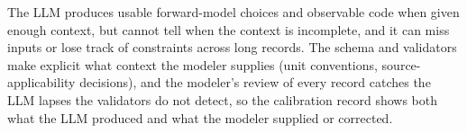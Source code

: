 The LLM produces usable forward-model choices and observable code when given enough context, but cannot tell when the context is incomplete, and it can miss inputs or lose track of constraints across long records. The schema and validators make explicit what context the modeler supplies (unit conventions, source-applicability decisions), and the modeler's review of every record catches the LLM lapses the validators do not detect, so the calibration record shows both what the LLM produced and what the modeler supplied or corrected.
